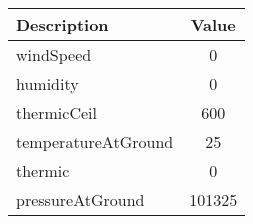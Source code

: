        \begin{center}

            \begin{tabular}{|l|c|}

               \hline

Description & Value  \\ \hline \hline 

windSpeed & 0 \\ \hline 

humidity & 0 \\ \hline 

thermicCeil & 600 \\ \hline 

temperatureAtGround & 25 \\ \hline 

thermic & 0 \\ \hline 

pressureAtGround & 101325 \\ \hline 

            \end{tabular}

        \end{center}

